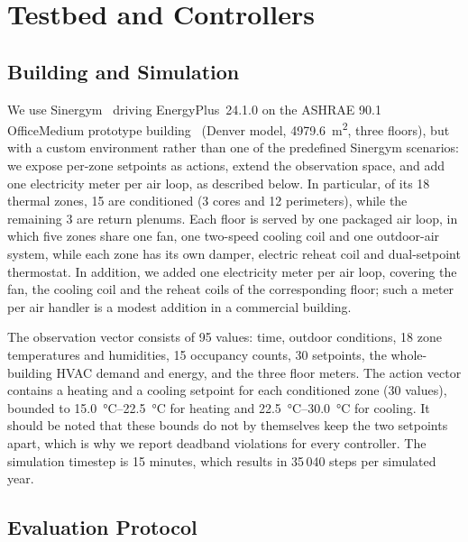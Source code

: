 \documentclass[conference]{IEEEtran}
\begin{document}
\section{Testbed and Controllers}
\label{sec:testbed}

\subsection{Building and Simulation}
We use Sinergym~\cite{jimenezraboso2021,campoynieves2025} driving
EnergyPlus~24.1.0 on the ASHRAE 90.1 OfficeMedium prototype
building~\cite{deru2011} (Denver model,
\SI{4979.6}{\metre\squared}, three floors), but with a custom environment rather than one of
the predefined Sinergym scenarios: we expose per-zone setpoints as actions,
extend the observation space, and add one electricity meter per air loop, as
described below.
In particular, of its 18 thermal zones, 15 are
conditioned (3 cores and 12 perimeters), while the remaining 3 are return
plenums. Each floor is served by one packaged air loop, in which five zones
share one fan, one two-speed cooling coil and one outdoor-air system, while
each zone has its own damper, electric reheat coil and dual-setpoint
thermostat. In addition, we added one electricity meter per air loop, covering
the fan, the cooling coil and the reheat coils of the corresponding floor;
such a meter per air handler is a modest addition in a commercial building.

The observation vector consists of 95 values: time, outdoor conditions, 18
zone temperatures and humidities, 15 occupancy counts, 30 setpoints, the
whole-building HVAC demand and energy, and the three floor meters. The action
vector contains a heating and a cooling setpoint for each conditioned zone (30
values), bounded to \SIrange{15.0}{22.5}{\celsius} for heating and
\SIrange{22.5}{30.0}{\celsius} for cooling. It should be noted that these
bounds do not by themselves keep the two setpoints apart, which is why we
report deadband violations for every controller. The simulation timestep is 15
minutes, which results in 35\,040 steps per simulated year.

\subsection{Evaluation Protocol}
\label{sec:protocol}
\end{document}
